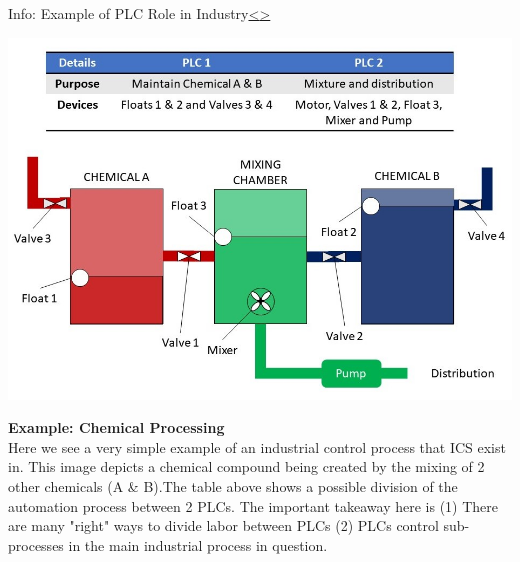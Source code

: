 \documentclass[12pt]{extarticle}
\newenvironment{instructionblock}{\Large\bgroup}{\egroup}
\newcounter{next}
\newcounter{prev}
\begin{document}

\pagebreak
{}
\begin{slide}{Info: Example of PLC Role in Industry}{\hyperref[slide \theprev]{\textless}\hyperref[slide \thenext]{\textgreater}}
	\begin{instructionblock}
		\begin{center}
		\includegraphics[scale=0.46]{figures/IndustrialProcessExample01.jpg}
		\end{center}
	\end{instructionblock}
\end{slide}
\vfill
\noindent
\textbf{Example: Chemical Processing}\\
Here we see a very simple example of an industrial control process that ICS exist in. This image depicts a chemical compound being created by the mixing of 2 other chemicals (A \& B).The table above shows a possible division of the automation process between 2 PLCs. The important takeaway here is (1) There are many "right" ways to divide labor between PLCs (2) PLCs control sub-processes in the main industrial process in question. 

\end{document}
